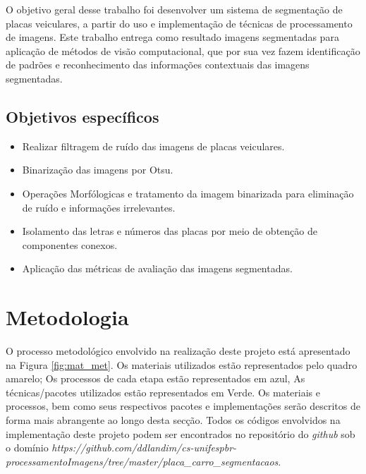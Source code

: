 \documentclass[
	12pt,				%
    oneside,			%
	a4paper,			%
	english,			%
	french,				%
	spanish,			%
	brazil,				%
	]{abntex2}
\begin{document}
O objetivo geral desse trabalho foi desenvolver um sistema de segmentação de placas veiculares, a partir do uso e implementação de técnicas de processamento de imagens. 
Este trabalho entrega como resultado imagens segmentadas para aplicação de métodos de visão computacional, que por sua vez fazem identificação de padrões e reconhecimento das informações contextuais das imagens segmentadas.

\subsection{Objetivos específicos}

\begin{itemize}

\item  Realizar filtragem de ruído das imagens de placas veiculares.
\item  Binarização das imagens por Otsu.
\item  Operações Morfólogicas e tratamento da imagem binarizada para eliminação de ruído e informações irrelevantes.
\item  Isolamento das letras e números das placas por meio de obtenção de componentes conexos.
\item  Aplicação das métricas de avaliação das imagens segmentadas.

\end{itemize}



\section{Metodologia}

O processo metodológico envolvido na realização deste projeto está apresentado na Figura \ref{fig:mat_met}. Os materiais utilizados estão representados pelo quadro amarelo; Os processos de cada etapa estão representados em azul, As técnicas/pacotes utilizados estão representados em Verde. Os materiais e processos, bem como seus respectivos pacotes e implementações serão descritos de forma mais abrangente ao longo desta secção. Todos os códigos envolvidos na implementação deste projeto podem ser encontrados no repositório do \textit{github} sob o domínio \textit{https://github.com/ddlandim/cs-unifespbr-processamentoImagens/tree/master/placa\_carro\_segmentacaos}.
\end{document}
